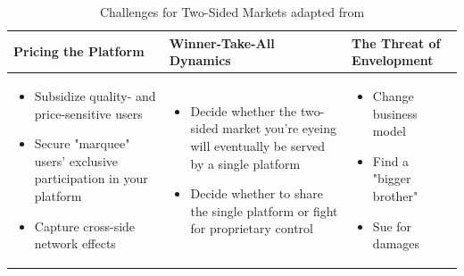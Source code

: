 \begin{table}[t]
	\caption[Challenges for Two-Sided Markets]{Challenges for Two-Sided Markets adapted from \citet{Eisenmann2006}}
	\label{tab:stsm}
	\centering
	\begin{tabular}{L{.3\textwidth}L{.3\textwidth}L{.3\textwidth}}
			\toprule 
			\footnotesize \textbf{Pricing the Platform} &
			\footnotesize \textbf{Winner-Take-All Dynamics} &
			\footnotesize \textbf{The Threat of Envelopment} \\ \midrule
			\vspace{-4mm}
			\footnotesize
			\begin{itemize}[leftmargin=*, parsep=0pt, topsep=0pt, itemsep=0pt]
				\item Subsidize quality- and price-sensitive users
				\item Secure "marquee" users' exclusive participation in your platform
				\item Capture cross-side network effects \vspace{-\baselineskip} 
			\end{itemize} &
			\vspace{-4mm}
			\footnotesize
			\begin{itemize}[leftmargin=*, parsep=0pt, topsep=0pt, itemsep=0pt]
				\item Decide whether the two-sided market you're eyeing will eventually be served by a single platform
				\item Decide whether to share the single platform or fight for proprietary control \vspace{-\baselineskip} 
			\end{itemize}	&
			\vspace{-4mm}
			\footnotesize
			\begin{itemize}[leftmargin=*, parsep=0pt, topsep=0pt, itemsep=0pt]
				\item Change business model
				\item Find a "bigger brother"
				\item Sue for damages \vspace{-\baselineskip} 
			\end{itemize}\\ \bottomrule
	\end{tabular}
\end{table}


